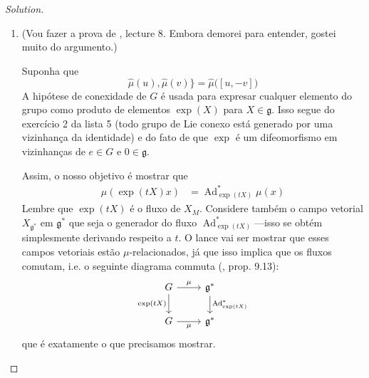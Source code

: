 \begin{proof}[Solution]\leavevmode
\begin{enumerate}[label=(\alph*)]
\item (Vou fazer a prova de \cite{wang}, lecture 8. Embora demorei para entender, gostei muito do argumento.)

	Suponha que
\begin{equation}\label{eq:lie-alg-hom}\hat{\mu}(u),\hat{\mu}(v)\}=\hat{\mu}\Big([u,-v]\Big)\end{equation}
A hipótese de conexidade de $G$ é usada para expresar cualquer elemento do grupo como produto de elementos $\operatorname{exp}(X)$ para $X \in \mathfrak{g}$. Isso segue do exercício 2 da lista 5 (todo grupo de Lie conexo está generado por uma vizinhança da identidade) e do fato de que $\operatorname{exp}$ é um difeomorfismo em vizinhanças de $e \in G$ e $0 \in\mathfrak{g}$.

Assim, o nosso objetivo é mostrar que
\begin{align*}
\mu(\operatorname{exp}(tX)x)&=\operatorname{Ad}^*_{\operatorname{exp}(tX)}\mu(x)
\end{align*}
Lembre que $\operatorname{exp}(tX)$ é o fluxo de $X_M$. Considere também o campo vetorial $X_{\mathfrak{g}^*}$ em $\mathfrak{g}^*$ que seja o generador do fluxo $\operatorname{Ad}^*_{\operatorname{exp}(tX)}$---isso se obtém simplesmente derivando respeito a $t$. O lance vai ser mostrar que esses campos vetoriais estão $\mu$-relacionados, já que isso implica que os fluxos comutam, i.e. o seguinte diagrama commuta (\cite{lee}, prop. 9.13):
\[\begin{tikzcd}
	G\arrow[r,"\mu"]\arrow[d,"\operatorname{exp}(tX)",swap]&\mathfrak{g}^*\arrow[d,"\operatorname{Ad}^*_{\operatorname{exp}(tX)}"]\\
	G\arrow[r,swap,"\mu"]&\mathfrak{g}^*
\end{tikzcd}\]
que é exatamente o que precisamos mostrar.


\end{enumerate}
\end{proof}
